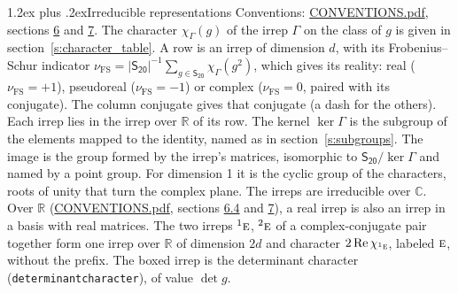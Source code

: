 \documentclass[10pt,a4paper]{article}
\makeatletter
\renewcommand\section{\@startsection{section}{1}{\z@}{-3ex plus -1ex minus -.2ex}%
  {1.2ex plus .2ex}{\normalfont\large\sffamily\bfseries\color{parttitle}}}
\numberwithin{equation}{section}
\newcommand{\grp}[1]{\mathsf{#1}}
\newcommand{\irr}[1]{\text{\normalfont\scshape #1}}
\newcommand{\conjpair}[1]{{}^{#1}}
\newcommand{\irchar}[1]{\chi_{#1}}
\newcommand{\fsind}{\nu_{\mathrm{FS}}}
\makeatother
\begin{document}
\section{Irreducible representations}\label{s:irreps}
Conventions: \href{../../CONVENTIONS.pdf}{CONVENTIONS.pdf}, sections \href{../../CONVENTIONS.pdf\#conv.6}{6} and \href{../../CONVENTIONS.pdf\#conv.7}{7}.
\leavevmode\label{n:function.character}\label{n:irrep.Gamma}The character $\irchar{\Gamma}(g)$ of the irrep $\Gamma$ on the class of $g$ is given in section~\ref{s:character_table}.
\leavevmode\label{n:index.dimension}\label{n:index.frobenius}\label{n:head.irrep}\label{n:head.reality}A row is an irrep of dimension $d$, with its Frobenius--Schur indicator $\fsind = |\grp{S_{20}}|^{-1}\allowbreak\sum_{g\in\grp{S_{20}}}\irchar{\Gamma}(g^2)$, which gives its reality: real ($\fsind = +1$), pseudoreal ($\fsind = -1$) or complex ($\fsind = 0$, paired with its conjugate). \label{n:head.conjugate}The column conjugate gives that conjugate (a dash for the others). \label{n:head.over.real}Each irrep lies in the irrep over $\mathbb{R}$ of its row. \label{n:head.kernel}The kernel $\ker\Gamma$ is the subgroup of the elements mapped to the identity, named as in section~\ref{s:subgroups}. \label{n:head.image}The image is the group formed by the irrep's matrices, isomorphic to $\grp{S_{20}}/\ker\Gamma$ and named by a point group. For dimension 1 it is the cyclic group of the characters, roots of unity that turn the complex plane. The irreps are irreducible over $\mathbb{C}$. Over $\mathbb{R}$ (\href{../../CONVENTIONS.pdf}{CONVENTIONS.pdf}, sections \href{../../CONVENTIONS.pdf\#conv.6.4}{6.4} and \href{../../CONVENTIONS.pdf\#conv.7}{7}), a real irrep is also an irrep in a basis with real matrices. The two irreps $\conjpair{1}\irr{e}$, $\conjpair{2}\irr{e}$ of a complex-conjugate pair together form one irrep over $\mathbb{R}$ of dimension $2d$ and character $2\operatorname{Re}\irchar{\conjpair{1}\irr{e}}$, labeled $\irr{e}$, without the prefix. \label{n:mark.determinant}The boxed irrep is the determinant character (\texttt{determinantcharacter}), of value $\det g$.
\setlength{\emergencystretch}{2em}\par\setlength{\emergencystretch}{0pt}
\end{document}
